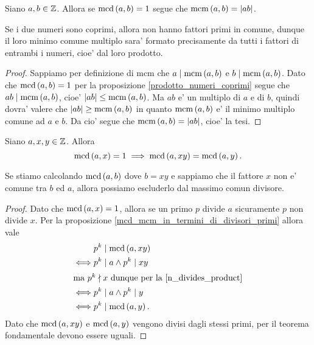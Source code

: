 \begin{proposition}\label{mcm_equals_product}
    Siano $a, b \in \mathbb{Z}$. Allora se $\operatorname{mcd}\left(a, b\right) = 1$ segue che $\operatorname{mcm}\left(a, b\right) = \left|ab\right|$.
\end{proposition}
\begin{intuition}
    Se i due numeri sono coprimi, allora non hanno fattori primi in comune, dunque il loro minimo comune multiplo sara' formato precisamente da tutti i fattori di entrambi i numeri, cioe' dal loro prodotto.
\end{intuition}
\begin{proof}
    Sappiamo per definizione di mcm che $a \mid \operatorname{mcm}\left(a, b\right)$ e $b \mid \operatorname{mcm}\left(a, b\right)$. Dato che $\operatorname{mcd}\left(a, b\right) = 1$ per la proposizione \ref{prodotto_numeri_coprimi} segue che $ab \mid \operatorname{mcm}\left(a, b\right)$, cioe' $\left|ab\right| \leq \operatorname{mcm}\left(a, b\right)$. Ma $ab$ e' un multiplo di $a$ e di $b$, quindi dovra' valere che $\left|ab\right| \geq \operatorname{mcm}\left(a, b\right)$ in quanto $\operatorname{mcm}\left(a, b\right)$ e' il minimo multiplo comune ad $a$ e $b$. Da cio' segue che $\operatorname{mcm}\left(a, b\right) = \left|ab\right|$, cioe' la tesi.
\end{proof}

\begin{proposition} \label{mcd_togliere_fattori_non_comuni}
    Siano $a, x, y \in \mathbb{Z}$. Allora 
    \begin{equation}
        \operatorname{mcd}\left(a, x\right) = 1 \implies \operatorname{mcd}\left(a, xy\right) = \operatorname{mcd}\left(a, y\right).
    \end{equation}
\end{proposition}
\begin{intuition}
    Se stiamo calcolando $\operatorname{mcd}\left(a, b\right)$ dove $b = xy$ e sappiamo che il fattore $x$ non e' comune tra $b$ ed $a$, allora possiamo escluderlo dal massimo comun divisore.
\end{intuition}
\begin{proof}
    Dato che $\operatorname{mcd}\left(a, x\right) = 1$, allora se un primo $p$ divide $a$ sicuramente $p$ non divide $x$. Per la proposizione \ref{mcd_mcm_in_termini_di_divisori_primi} allora vale
    \begin{alignat*}
        {1}
        &p^k \mid \operatorname{mcd}\left(a, xy\right) \\ 
        \iff &p^k \mid a \land p^k \mid xy\\
        \intertext{ma $p^k \nmid x$ dunque per la \ref{n_divides_product}}
        \iff &p^k \mid a \land p^k \mid y \\
        \iff &p^k \mid \operatorname{mcd}\left(a, y\right).
    \end{alignat*}
    Dato che $\operatorname{mcd}\left(a, xy\right)$ e $\operatorname{mcd}\left(a, y\right)$ vengono divisi dagli stessi primi, per il teorema fondamentale devono essere uguali.
\end{proof}

